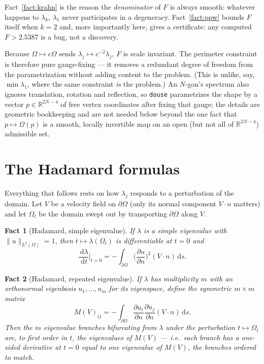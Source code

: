 \documentclass[11pt]{article}
\newcommand{\dd}{\,\mathrm{d}}
\newcommand{\Om}{\Omega}
\newcommand{\bd}{\partial\Omega}
\newcommand{\code}[1]{\texttt{#1}}
\newcommand{\pdn}[1]{\frac{\partial #1}{\partial n}}
\newcommand{\R}{\mathbb{R}}
\theoremstyle{plain}
\newtheorem{fact}{Fact}
\begin{document}
Fact~\ref{fact:krahn} is the reason the \emph{denominator} of $F$ is always smooth: whatever
happens to $\lambda_k$, $\lambda_1$ never participates in a degeneracy. Fact~\ref{fact:ppw} bounds
$F$ itself when $k=2$ and, more importantly here, gives a certificate: any computed $F>2.5387$
is a bug, not a discovery.

Because $\Om\mapsto c\Om$ sends $\lambda_j\mapsto c^{-2}\lambda_j$, $F$ is scale invariant. The
perimeter constraint is therefore pure gauge-fixing --- it removes a redundant degree of freedom
from the parametrization without adding content to the problem. (This is unlike, say,
$\min\lambda_1$, where the same constraint \emph{is} the problem.) An $N$-gon's spectrum also
ignores translation, rotation and reflection, so \code{douse} parametrizes the shape by a vector
$p\in\R^{2N-4}$ of free vertex coordinates after fixing that gauge; the details are geometric
bookkeeping and are not needed below beyond the one fact that $p\mapsto\Om(p)$ is a smooth,
locally invertible map on an open (but not all of $\R^{2N-4}$) admissible set.

\section{The Hadamard formulas}\label{sec:hadamard}

Everything that follows rests on how $\lambda_j$ responds to a perturbation of the domain. Let
$V$ be a velocity field on $\bd$ (only its normal component $V\cdot n$ matters) and let $\Om_t$
be the domain swept out by transporting $\bd$ along $V$.

\begin{fact}[Hadamard, simple eigenvalue]\label{fact:had-simple}
If $\lambda$ is a simple eigenvalue with $\|u\|_{L^2(\Om)}=1$, then $t\mapsto\lambda(\Om_t)$ is
differentiable at $t=0$ and
\begin{equation}\label{eq:hadamard-simple}
  \frac{\dd\lambda}{\dd t}\bigg|_{t=0}=-\int_{\bd}\Big(\pdn{u}\Big)^{\!2}(V\cdot n)\dd s .
\end{equation}
\end{fact}

\begin{fact}[Hadamard, repeated eigenvalue]\label{fact:had-multi}
If $\lambda$ has multiplicity $m$ with an orthonormal eigenbasis $u_1,\dots,u_m$ for its
eigenspace, define the symmetric $m\times m$ matrix
\begin{equation}\label{eq:M}
  M(V)_{ij}=-\int_{\bd}\pdn{u_i}\pdn{u_j}(V\cdot n)\dd s .
\end{equation}
Then the $m$ eigenvalue branches bifurcating from $\lambda$ under the perturbation $t\mapsto\Om_t$
are, to first order in $t$, the eigenvalues of $M(V)$ --- i.e.\ each branch has a one-sided
derivative at $t=0$ equal to one eigenvalue of $M(V)$, the branches ordered to match.
\end{fact}
\end{document}
